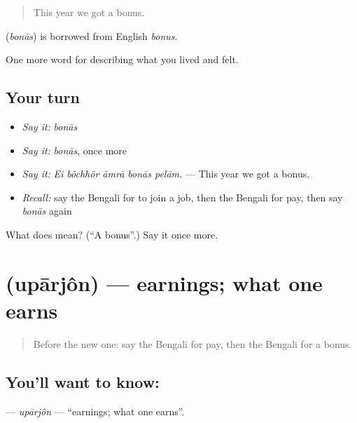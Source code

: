 \begin{quote}
This year we got a bonus.
\end{quote}

\begin{cousinweb}
\textbf{} (\emph{bonās}) is borrowed from English \emph{bonus}.
\end{cousinweb}

\begin{grammarlens}[title={What you've built}]
One more word for describing what you lived and felt.
\end{grammarlens}

\subsection*{Your turn}
\begin{itemize}
\raggedright
  \item \emph{Say it:} \emph{bonās}
  \item \emph{Say it:} \emph{bonās}, once more
  \item \emph{Say it:} \emph{Ei bôchhôr āmrā bonās pelām.} — This year we got a bonus.
  \item \emph{Recall:} say the Bengali for to join a job, then the Bengali for pay, then say \emph{bonās} again
\end{itemize}

\begin{tcolorbox}[breakable,colback=teal!4,colframe=teal!35!black,title={Before you move on}]
What does  mean? (\textquotedblleft{}A bonus\textquotedblright{}.) Say it once more.
\end{tcolorbox}
\section[\texorpdfstring{\bn{উপার্জন} (upārjôn)}{উপার্জন (upārjôn)}]{ (upārjôn) — earnings; what one earns}

\label{lesson:BN-C495-uparjon}



\begin{quote}
Before the new one: say the Bengali for pay, then the Bengali for a bonus.
\end{quote}

\subsection*{You'll want to know: }
\textbf{} — \emph{upārjôn} — \textquotedblleft{}earnings; what one earns\textquotedblright{}.

